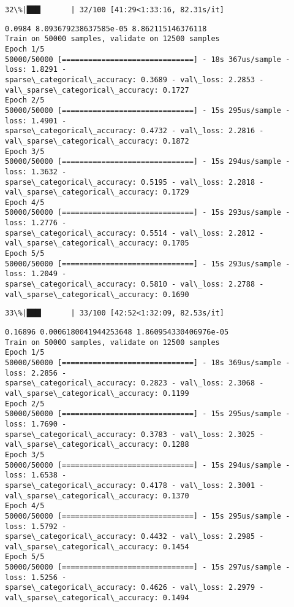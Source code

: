 \documentclass[11pt]{article}
\begin{document}
    \begin{Verbatim}[commandchars=\\\{\}]
 32\%|███▏      | 32/100 [41:29<1:33:16, 82.31s/it]
    \end{Verbatim}

    \begin{Verbatim}[commandchars=\\\{\}]
0.0984 8.093679238637585e-05 8.862115146376118
Train on 50000 samples, validate on 12500 samples
Epoch 1/5
50000/50000 [==============================] - 18s 367us/sample - loss: 1.8291 -
sparse\_categorical\_accuracy: 0.3689 - val\_loss: 2.2853 -
val\_sparse\_categorical\_accuracy: 0.1727
Epoch 2/5
50000/50000 [==============================] - 15s 295us/sample - loss: 1.4901 -
sparse\_categorical\_accuracy: 0.4732 - val\_loss: 2.2816 -
val\_sparse\_categorical\_accuracy: 0.1872
Epoch 3/5
50000/50000 [==============================] - 15s 294us/sample - loss: 1.3632 -
sparse\_categorical\_accuracy: 0.5195 - val\_loss: 2.2818 -
val\_sparse\_categorical\_accuracy: 0.1729
Epoch 4/5
50000/50000 [==============================] - 15s 293us/sample - loss: 1.2776 -
sparse\_categorical\_accuracy: 0.5514 - val\_loss: 2.2812 -
val\_sparse\_categorical\_accuracy: 0.1705
Epoch 5/5
50000/50000 [==============================] - 15s 293us/sample - loss: 1.2049 -
sparse\_categorical\_accuracy: 0.5810 - val\_loss: 2.2788 -
val\_sparse\_categorical\_accuracy: 0.1690
    \end{Verbatim}

    \begin{Verbatim}[commandchars=\\\{\}]
 33\%|███▎      | 33/100 [42:52<1:32:09, 82.53s/it]
    \end{Verbatim}

    \begin{Verbatim}[commandchars=\\\{\}]
0.16896 0.0006180041944253648 1.860954330406976e-05
Train on 50000 samples, validate on 12500 samples
Epoch 1/5
50000/50000 [==============================] - 18s 369us/sample - loss: 2.2856 -
sparse\_categorical\_accuracy: 0.2823 - val\_loss: 2.3068 -
val\_sparse\_categorical\_accuracy: 0.1199
Epoch 2/5
50000/50000 [==============================] - 15s 295us/sample - loss: 1.7690 -
sparse\_categorical\_accuracy: 0.3783 - val\_loss: 2.3025 -
val\_sparse\_categorical\_accuracy: 0.1288
Epoch 3/5
50000/50000 [==============================] - 15s 294us/sample - loss: 1.6538 -
sparse\_categorical\_accuracy: 0.4178 - val\_loss: 2.3001 -
val\_sparse\_categorical\_accuracy: 0.1370
Epoch 4/5
50000/50000 [==============================] - 15s 295us/sample - loss: 1.5792 -
sparse\_categorical\_accuracy: 0.4432 - val\_loss: 2.2985 -
val\_sparse\_categorical\_accuracy: 0.1454
Epoch 5/5
50000/50000 [==============================] - 15s 297us/sample - loss: 1.5256 -
sparse\_categorical\_accuracy: 0.4626 - val\_loss: 2.2979 -
val\_sparse\_categorical\_accuracy: 0.1494
    \end{Verbatim}
\end{document}

